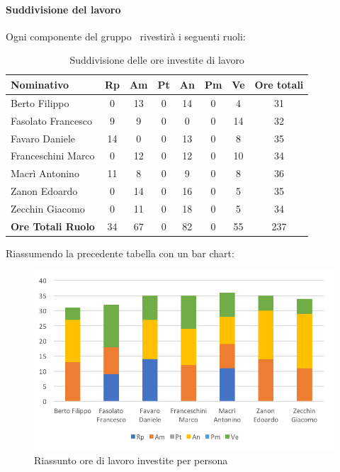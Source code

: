 \documentclass[../PianoDiProgetto_v4.0.0.tex]{subfiles}
\begin{document}
			\paragraph{Suddivisione del lavoro}
			Ogni componente del gruppo \kpanic\ rivestirà i seguenti ruoli:
			\begin{table}[h]
				\begin{tabularx}{\textwidth}{l * {6}{C} c}
				\toprule
				\textbf{Nominativo} & \textbf{Rp} & \textbf{Am} & \textbf{Pt} & \textbf{An} & \textbf{Pm} & \textbf{Ve} & \textbf{Ore totali} \\
				\midrule
				Berto Filippo &	0 & 13 & 0 & 14 & 0 & 4 &  31 \\
				Fasolato Francesco & 9 & 9 & 0 & 0 & 0 & 14 & 32 \\
				Favaro Daniele & 14 & 0 & 0 & 13 & 0 & 8 & 35 \\
				Franceschini Marco & 0 & 12 & 0 & 12 & 0 & 10 & 34 \\
				Macrì Antonino & 11 & 8 & 0 & 9 & 0 & 8 & 36 \\
				Zanon Edoardo &	0 & 14 & 0 & 16 & 0 & 5 & 35 \\
				Zecchin Giacomo & 0 & 11 & 0 & 18 & 0 & 5 & 34 \\
				\midrule			
				\textbf{Ore Totali Ruolo} & 34 & 67 & 0 & 82 & 0 & 55 & 237 \\
				\bottomrule
				\end{tabularx}
				\caption{Suddivisione delle ore investite di lavoro}		
			\end{table}

			Riassumendo la precedente tabella con un bar chart:	
			\begin{figure}[!h]
				\centering
				\includegraphics[width=\textwidth]{Preventivo//Immagini/investito_oreRuoloPersona.png}
				\caption{Riassunto ore di lavoro investite per persona}
			\end{figure}	
			
\end{document}
